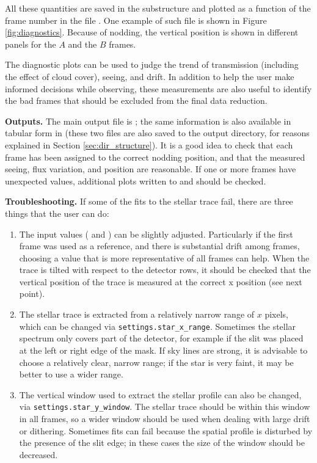 \documentclass[a4paper]{article}
\begin{document}
\begin{sloppypar}
All these quantities are saved in the substructure  and plotted as a function of the frame number in the file . One example of such file is shown in Figure \ref{fig:diagnostics}. Because of nodding, the vertical position is shown in different panels for the $A$ and the $B$ frames.

The diagnostic plots can be used to judge the trend of transmission (including the effect of cloud cover), seeing, and drift. In addition to help the user make informed decisions while observing, these measurements are also useful to identify the bad frames that should be excluded from the final data reduction.

\medskip
\noindent
\textbf{Outputs.} The main output file is ; the same information is also available in tabular form in  (these two files are also saved to the output directory, for reasons explained in Section \ref{sec:dir_structure}).  It is a good idea to check that each frame has been assigned to the correct nodding position, and that the measured seeing, flux variation, and position are reasonable. If one or more frames have unexpected values, additional plots written to  and  should be checked.

\medskip
\noindent
\textbf{Troubleshooting.} If some of the fits to the stellar trace fail, there are three things that the user can do:
\begin{enumerate}
\item The input values ( and ) can be slightly adjusted. Particularly if the first frame was used as a reference, and there is substantial drift among frames, choosing a value that is more representative of all frames can help. When the trace is tilted with respect to the detector rows, it should be checked that the vertical position of the trace is measured at the correct x position (see next point).
\item The stellar trace is extracted from a relatively narrow range of $x$ pixels, which can be changed via \texttt{settings.star\_x\_range}. Sometimes the stellar spectrum only covers part of the detector, for example if the slit was placed at the left or right edge of the mask. If sky lines are strong, it is advisable to choose a relatively clear, narrow range; if the star is very faint, it may be better to use a wider range.
\item The vertical window used to extract the stellar profile can also be changed, via \texttt{settings.star\_y\_window}. The stellar trace should be within this window in all frames, so a wider window should be used when dealing with large drift or dithering. Sometimes fits can fail because the spatial profile is disturbed by the presence of the slit edge; in these cases the size of the window should be decreased.
\end{enumerate}



\end{sloppypar}
\end{document}
